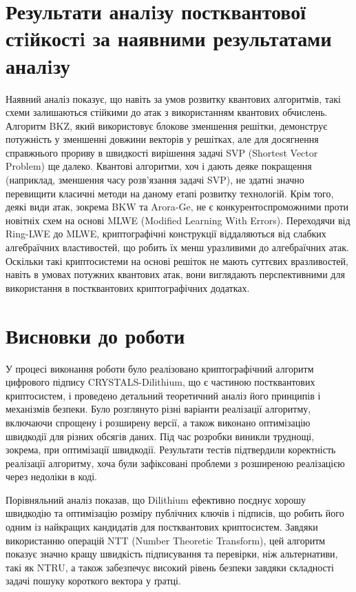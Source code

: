 \documentclass[12pt]{HomusWorkus}
\begin{document}
\section{Результати аналiзу постквантової стiйкостi за наявними результатами аналiзу}

Наявний аналіз показує, що навіть за умов розвитку квантових алгоритмів, такі схеми залишаються стійкими до атак з використанням квантових обчислень. Алгоритм BKZ, який використовує блокове зменшення решітки, демонструє потужність у зменшенні довжини векторів у решітках, але для досягнення справжнього прориву в швидкості вирішення задачі SVP (Shortest Vector Problem) ще далеко. Квантові алгоритми, хоч і дають деяке покращення (наприклад, зменшення часу розв'язання задачі SVP), не здатні значно перевищити класичні методи на даному етапі розвитку технологій. Крім того, деякі види атак, зокрема BKW та Arora-Ge, не є конкурентоспроможними проти новітніх схем на основі MLWE (Modified Learning With Errors). Переходячи від Ring-LWE до MLWE, криптографічні конструкції віддаляються від слабких алгебраїчних властивостей, що робить їх менш уразливими до алгебраїчних атак. Оскільки такі криптосистеми на основі решіток не мають суттєвих вразливостей, навіть в умовах потужних квантових атак, вони виглядають перспективними для використання в постквантових криптографічних додатках.


\section{Висновки до роботи}

У процесі виконання роботи було реалізовано криптографічний алгоритм цифрового підпису CRYSTALS-Dilithium, що є частиною постквантових криптосистем, і проведено детальний теоретичний аналіз його принципів і механізмів безпеки. Було розглянуто різні варіанти реалізації алгоритму, включаючи спрощену і розширену версії, а також виконано оптимізацію швидкодії для різних обсягів даних. Під час розробки виникли труднощі, зокрема, при оптимізації швидкодії. Результати тестів підтвердили коректність реалізації алгоритму, хоча були зафіксовані проблеми з розширеною реалізацією через недоліки в коді.

Порівняльний аналіз показав, що Dilithium ефективно поєднує хорошу швидкодію та оптимізацію розміру публічних ключів і підписів, що робить його одним із найкращих кандидатів для постквантових криптосистем. Завдяки використанню операцій NTT (Number Theoretic Transform), цей алгоритм показує значно кращу швидкість підписування та перевірки, ніж альтернативи, такі як NTRU, а також забезпечує високий рівень безпеки завдяки складності задачі пошуку короткого вектора у ґратці.






\end{document}
